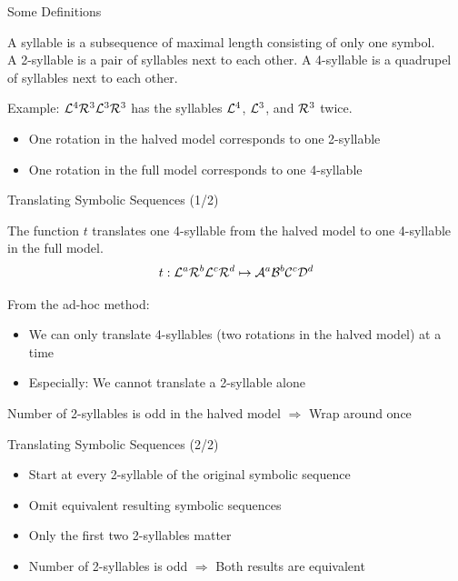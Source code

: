 \begin{frame}{Some Definitions}
	\vspace{-1em}
	\begin{definition}[Syllables]
		A syllable is a subsequence of maximal length consisting of only one symbol. \\[1em]
		A 2-syllable is a pair of syllables next to each other.
		A 4-syllable is a quadrupel of syllables next to each other.
	\end{definition}
	\pause
	Example: $\mathcal{L}^4\mathcal{R}^3\mathcal{L}^3\mathcal{R}^3$ has the syllables $\mathcal{L}^4$, $\mathcal{L}^3$, and $\mathcal{R}^3$ twice.
	\vspace{1em}
	\begin{itemize}
		\pause
		\item One rotation in the halved model corresponds to one 2-syllable
		\item One rotation in the full model corresponds to one 4-syllable
	\end{itemize}
\end{frame}

\begin{frame}{Translating Symbolic Sequences (1/2)}
	\vspace{-1em}
	\begin{definition}
		The function $t$ translates one 4-syllable from the halved model to one 4-syllable in the full model.
		\begin{align*}
			t: \mathcal{L}^a\mathcal{R}^b\mathcal{L}^c\mathcal{R}^d \mapsto \mathcal{A}^a\mathcal{B}^b\mathcal{C}^c\mathcal{D}^d
		\end{align*}
	\end{definition}

	\pause
	From the ad-hoc method:
	\begin{itemize}
		\item We can only translate 4-syllables (two rotations in the halved model) at a time
		\item Especially: We cannot translate a 2-syllable alone
	\end{itemize}
	\pause
	\vspace{1em}
	Number of 2-syllables is odd in the halved model $\Rightarrow$ Wrap around once
\end{frame}

\begin{frame}{Translating Symbolic Sequences (2/2)}
	\begin{itemize}
		\item Start at every 2-syllable of the original symbolic sequence
		\item Omit equivalent resulting symbolic sequences
		      \pause \vspace{2em}
		\item Only the first two 2-syllables matter
		\item Number of 2-syllables is odd $\Rightarrow$ Both results are equivalent
	\end{itemize}
\end{frame}

